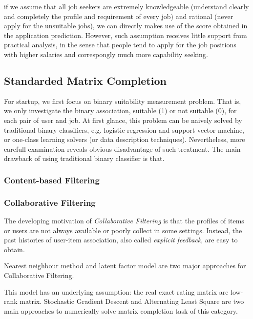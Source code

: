 \documentclass{article} %
\begin{document}
if we assume that all job seekers are extremely knowledgeable (understand
clearly and completely the profile and requirement of every job) and rational
(never apply for the unsuitable jobs), we can directly makes use of the score
obtained in the application prediction. However, such assumption receives
little support from practical analysis, in the sense that people tend to apply
for the job positions with higher salaries and correspongly much more
capability seeking.

\subsection{Standarded Matrix Completion}
For startup, we first focus on binary suitability measurement problem. That
is, we only investigate the binary association, suitable (1) or not suitable
(0), for each pair of user and job. 
At first glance, this problem can be naively solved by traditional binary
classifiers, e.g. logistic regression and support vector machine, or one-class
learning solvers (or data description techniques).
Nevertheless, more carefull examination reveals obvious disadvantage of such
treatment. The main drawback of using traditional binary classifier is that.

\subsubsection{Content-based Filtering}

\subsubsection{Collaborative Filtering}
The developing motivation of {\it Collaborative Filtering} is that the
profiles of items or users are not always available or poorly collect in
some settings. Instead, the past histories of user-item association, also called {\it
    explicit feedback}, are easy to obtain.  

Nearest neighbour method and latent factor model are two major approaches for
Collaborative Filtering.


This model has an underlying assumption: the real exact rating matrix are
low-rank matrix.   
Stochastic Gradient Descent and Alternating Least Square are two main
approaches to numerically solve matrix completion task of this category.
\end{document}
